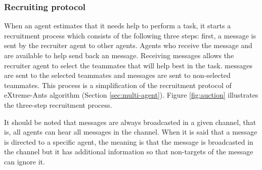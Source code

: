 \subsubsection{Recruiting protocol}
\label{sec:recruiting}
When an agent estimates that it needs help to perform a task, it starts a recruitment process which consists of the following three steps: first, a  message is sent by the recruiter agent to other agents. Agents who receive the  message and are available to help  send back an  message. Receiving  messages allows the recruiter agent to select the teammates that will help best in the task.  messages are sent to the selected teammates and  messages are sent to non-selected teammates. This process is a simplification of the recruitment protocol of eXtreme-Ants algorithm (Section \ref{sec:multi-agent}). Figure \ref{fig:auction} illustrates the three-step recruitment process.


It should be noted that messages are always broadcasted in a given channel, that is, all agents can hear all messages in the channel. When it is said that a message is directed to a specific agent, the meaning is that the message is broadcasted in the channel but it has additional information so that non-targets of the message can ignore it.

